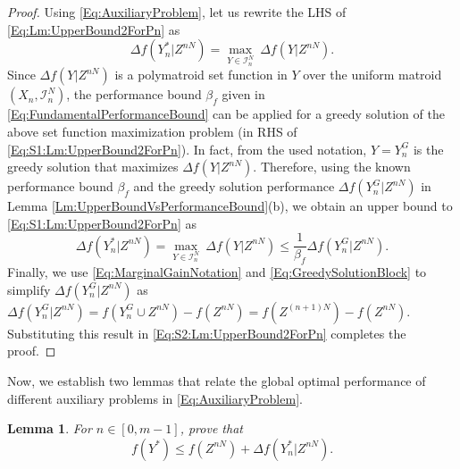\documentclass[conference]{IEEEtran}
\newtheorem{lemma}{Lemma}
\begin{document}
\begin{proof}
Using \eqref{Eq:AuxiliaryProblem}, let us rewrite the LHS of \eqref{Eq:Lm:UpperBound2ForPn} as
\begin{equation}\label{Eq:S1:Lm:UpperBound2ForPn}
    \Delta f(Y^*_n\vert Z^{nN}) = \underset{Y\in\mathcal{I}^N_n}{\max}\ \Delta f(Y\vert Z^{nN}).
\end{equation}
Since $\Delta f(Y\vert Z^{nN})$ is a polymatroid set function in $Y$ over the uniform matroid $(X_n,\mathcal{I}^N_n)$, the performance bound $\beta_f$ given in \eqref{Eq:FundamentalPerformanceBound} can be applied for a greedy solution of the above set function maximization problem (in RHS of \eqref{Eq:S1:Lm:UpperBound2ForPn}). In fact, from the used notation, $Y=Y^G_n$ is the greedy solution that maximizes $\Delta f(Y\vert Z^{nN})$. Therefore, using the known performance bound $\beta_f$ and the greedy solution performance $\Delta f(Y^G_n\vert Z^{nN})$ in Lemma \ref{Lm:UpperBoundVsPerformanceBound}(b), we obtain an upper bound to \eqref{Eq:S1:Lm:UpperBound2ForPn} as 
\begin{equation}\label{Eq:S2:Lm:UpperBound2ForPn}
    \Delta f(Y^*_n\vert Z^{nN}) = \underset{Y\in\mathcal{I}^N_n}{\max}\ \Delta f(Y\vert Z^{nN}) \leq \frac{1}{\beta_f} \Delta f(Y^G_n\vert Z^{nN}).
\end{equation}
Finally, we use \eqref{Eq:MarginalGainNotation} and \eqref{Eq:GreedySolutionBlock} to simplify $\Delta f(Y^G_n\vert Z^{nN})$ as $\Delta f(Y^G_n\vert Z^{nN}) = f(Y^G_n\cup Z^{nN})-f(Z^{nN}) = f(Z^{(n+1)N})-f(Z^{nN})$. Substituting this result in \eqref{Eq:S2:Lm:UpperBound2ForPn} completes the proof. \end{proof}








Now, we establish two lemmas that relate the global optimal performance of different auxiliary problems in \eqref{Eq:AuxiliaryProblem}.
\begin{lemma}\label{Lm:UpperBoundForfYStar}
For $n\in[0,m-1]$, prove that
\begin{equation}\label{Eq:Lm:UpperBoundForfYStar}
f(Y^*) \leq f(Z^{nN}) + \Delta f(Y^*_n \vert Z^{nN}).    
\end{equation}
\end{lemma}
\end{document}
